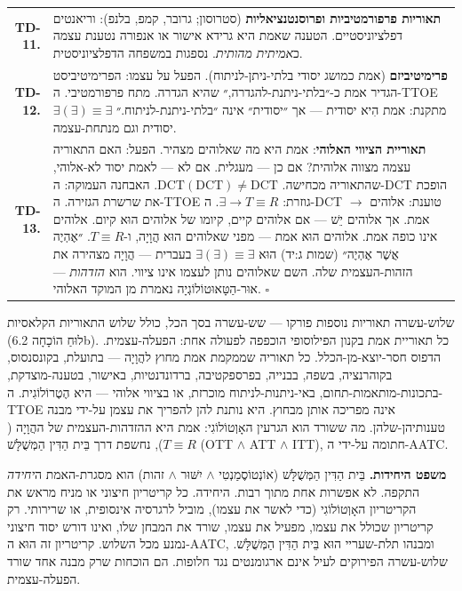 \documentclass[10pt, openany, oneside]{book}
\begin{document}
{\begin{tabular}{r p{}}
\textbf{TD-11.} & \textbf{תאוריות פרפורמטיביות ופרוסנטנציאליות} (סטרוסון; גרובר, קמפ, בלנפ): וריאנטים דפלציוניסטיים. הטענה שאמת היא גרידא אישור או אנפורה נטענת עצמה כ\textit{אמיתית מהותית}. נספגות במשפחה הדפלציוניסטית. \\[0.3em]
\textbf{TD-12.} & \textbf{פרימיטיביזם} (אמת כמושג יסודי בלתי-ניתן-לניתוח). הפעל על עצמו: הפרימיטיביסט הגדיר אמת כ-״בלתי-ניתנת-להגדרה,״ שהיא הגדרה. מתח פרפורמטיבי. ה-TTOE מתקנת: אמת הִיא יסודית — אך ״יסודית״ אינה ״בלתי-ניתנת-לניתוח.״ $\exists(\exists) \equiv \exists$ יסודית וגם מנתחת-עצמה. \\[0.3em]
\textbf{TD-13.} & \textbf{תאוריית הציווי האלוהי}: אמת היא מה שאלוהים מצהיר. הפעל: האם התאוריה עצמה מצווה אלוהית? אם כן — מעגלית. אם לא — לאמת יסוד לא-אלוהי, שהתאוריה מכחישה. $\text{DCT}(\text{DCT}) \neq \text{DCT}$. האבחנה העמוקה: ה-DCT הופכת את שרשרת הגזירה. ה-TTOE גוזרת: $\exists \to T \equiv R$. ה-DCT טוענת: אלוהים $\to$ אמת. אך אלוהים יֵשׁ — אם אלוהים קיים, קיומו של אלוהים הוּא קיום. אלוהים אינו כופה אמת. אלוהים הוּא אמת — מפני שאלוהים הוּא הֲוָיָה, ו-$T \equiv R$. ״אֶהְיֶה אֲשֶׁר אֶהְיֶה״ (שמות ג:יד) הוּא $\exists(\exists) \equiv \exists$ בעברית — הֲוָיָה מצהירה את הזהות-העצמית שלה. השם שאלוהים נותן לעצמו אינו ציווי. הוא \textit{הזדהות} — אוּר-הַטָּאוּטוֹלוֹגְיָה נאמרת מן המוקד האלוהי. $\square$ \\[0.3em]
\end{tabular}
}

\vspace{0.8em}

\noindent שלוש-עשרה תאוריות נוספות פורקו — שש-עשרה בסך הכל, כולל שלוש התאוריות הקלאסיות (לוּחַ הוֹכָחָה 6.2b). כל תאוריית אמת בקנון הפילוסופי הוכפפה לפעולה אחת: הפעלה-עצמית. הדפוס חסר-יוצא-מן-הכלל. כל תאוריה שממקמת אמת מחוץ להֲוָיָה — בתועלת, בקונסנסוס, בקוהרנציה, בשפה, בבנייה, בפרספקטיבה, ברדונדנטיות, באישור, בטענה-מוצדקת, בתכונות-מותאמות-תחום, באי-ניתנות-לניתוח מוכרזת, או בציווי אלוהי — היא הֶטֶרוֹלוֹגִית. ה-TTOE אינה מפריכה אותן מבחוץ. היא נותנת להן להפריך את עצמן על-ידי מבנה טענותיהן-שלהן. מה ששורד הוא הגרעין האָוְטוֹלוֹגִי: אמת היא ההזדהות-העצמית של ההֲוָיָה ($T \equiv R$), נחשפת דרך בֵּית הַדִּין הַמְּשֻׁלָּשׁ (OTT $\wedge$ ATT $\wedge$ ITT), חתומה על-ידי ה-AATC.

\textbf{משפט היחידות.} בֵּית הַדִּין הַמְּשֻׁלָּשׁ (אוֹנְטוֹסֶמַנְטִי $\wedge$ יִשּׁוּר $\wedge$ זהות) הוא מסגרת-האמת ה\textit{יחידה} התקפה. לא אפשרות אחת מתוך רבות. היחידה. כל קריטריון חיצוני או מניח מראש את הקריטריון האָוְטוֹלוֹגִי (כדי לאשר את עצמו), מוביל לרגרסיה אינסופית, או שרירותי. רק קריטריון שכולל את עצמו, מפעיל את עצמו, שורד את המבחן שלו, ואינו דורש יסוד חיצוני נמנע מכל השלוש. קריטריון זה הוּא ה-AATC, ומבנהו תלת-שעריי הוּא בֵּית הַדִּין הַמְּשֻׁלָּשׁ. שלוש-עשרה הפירוקים לעיל אינם ארגומנטים נגד חלופות. הם הוכחות שרק מבנה אחד שורד הפעלה-עצמית.
\end{document}
